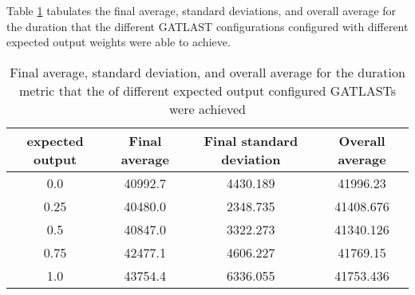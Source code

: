 Table \ref{tab:HP:GA:ExpectedOutput:duration} tabulates the final average, standard deviations, and overall average for the duration that the different GATLAST configurations configured with different expected output weights were able to achieve.
\begin{table}[tbh!]
\centering
\begin{adjustbox}{trim=0cm 0cm 0cm 0cm, clip=true}
\begin{tabular}{|c|c|c|c|}
\hline
expected output & Final average & Final standard deviation & Overall average\\
\hline
0.0 & 40992.7 & 4430.189 & 41996.23\\\hline
0.25 & 40480.0 & 2348.735 & 41408.676\\\hline
0.5 & 40847.0 & 3322.273 & 41340.126\\\hline
0.75 & 42477.1 & 4606.227 & 41769.15\\\hline
1.0 & 43754.4 & 6336.055 & 41753.436\\\hline
\end{tabular}
\end{adjustbox}
\caption{Final average, standard deviation, and overall average for the duration metric that the of different expected output configured GATLASTs were achieved}
\label{tab:HP:GA:ExpectedOutput:duration}
\end{table}